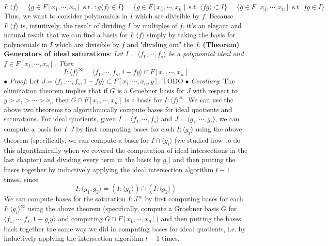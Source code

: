 \documentclass{article}
\newcommand*{\tb}{\textbf}
\newcommand*{\ti}{\textit}
\newcommand*{\n}{\newline}
\newcommand*{\nn}{\newline \newline}
\newcommand*{\Fx}{\ensuremath{F[x_1, \cdots, x_n]}}
\newcommand*{\fs}{f_1, \cdots, f_s}
\newcommand*{\gt}{g_1, \cdots, g_t}
\newcommand*{\lfsr}{\langle f_1, \cdots, f_s \rangle}
\begin{document}
$$ I : \langle f \rangle = \{ g \in \Fx \text { s.t. }: g \langle f \rangle \in I \} = \{ g \in \Fx \text{ s.t. } \langle f g \rangle \subset I \} = \{ g \in \Fx \text{ s.t. } f g \in I \} $$
\indent Thus, we want to consider polynomials in $ I $ which are divisible by $ f $. Because $ I : \langle f \rangle $ is, intuitively, the result of dividing $ I $ by multiples of $ f $, it's an elegant and natural result that we can find a basis for $ I : \langle f \rangle $ simply by taking the basis for polynomials in $ I $ which are divisible by $ f $ and "dividing out" the $ f $.
\nn
\tb{(Theorem) Generators of ideal saturations}: \ti{Let $ I = \lfsr $ be a polynomial ideal and $ f \in \Fx $. Then}
$$ I : \langle f \rangle^\infty = \langle \fs, 1 - f y \rangle \cap \Fx $$
\indent $ \bullet $ \ti{Proof}: Let $ J = \langle \fs, 1 - f y \rangle \subset F[x_1, \cdots, x_n, y] $. TODO
\n
\indent $ \bullet $ \ti{Corollary}: The elimination theorem implies that if $ G $ is a Groebner basis for $ J $ with respect to $ y > x_1 > \cdots > x_n $ then $ G \cap \Fx $ is a basis for $ I : \langle f \rangle^\infty $.
\nn
We can use the above two theorems to algorithmically compute bases for ideal quotients and saturations. For ideal quotients, given $ I = \lfsr $ and $ J = \langle \gt \rangle $, we can compute a basis for $ I : J $ by first computing bases for each $ I : \langle g_j \rangle $ using the above theorem (specifically, we can compute a basis for $ I \cap \langle g_i \rangle $ (we studied how to do this algorithmically when we covered the computation of ideal intersections in the last chapter) and dividing every term in the basis by $ g_i $) and then putting the bases together by inductively applying the ideal intersection algorithm $ t - 1 $ times, since 
$$ I : \langle g_1, g_2 \rangle = (I : \langle g_1 \rangle) \cap (I : \langle g_2 \rangle) $$
We can compute bases for the saturation $ I : J^\infty $ by first computing bases for each $ I : \langle g_i \rangle^\infty $ using the above theorem (specifically, compute a Groebner basis $ G $ for $ \langle \fs, 1 - g_i y \rangle $ and computing $ G \cap \Fx $) and then putting the bases back together the same way we did in computing bases for ideal quotients, i.e. by inductively applying the intersection algorithm $ t - 1 $ times.
\end{document}
